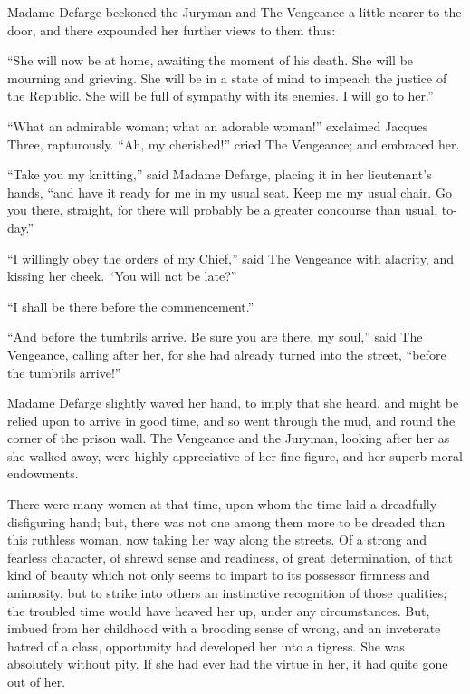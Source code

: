 Madame Defarge beckoned the Juryman and The Vengeance a little nearer
to the door, and there expounded her further views to them thus:

``She will now be at home, awaiting the moment of his death.  She will
be mourning and grieving.  She will be in a state of mind to impeach
the justice of the Republic.  She will be full of sympathy with its
enemies.  I will go to her.''

``What an admirable woman; what an adorable woman!'' exclaimed
Jacques Three, rapturously.  ``Ah, my cherished!'' cried The Vengeance;
and embraced her.

``Take you my knitting,'' said Madame Defarge, placing it in her
lieutenant's hands, ``and have it ready for me in my usual seat.
Keep me my usual chair.  Go you there, straight, for there will
probably be a greater concourse than usual, to-day.''

``I willingly obey the orders of my Chief,'' said The Vengeance with
alacrity, and kissing her cheek.  ``You will not be late?''

``I shall be there before the commencement.''

``And before the tumbrils arrive.  Be sure you are there, my soul,''
said The Vengeance, calling after her, for she had already turned
into the street, ``before the tumbrils arrive!''

Madame Defarge slightly waved her hand, to imply that she heard, and
might be relied upon to arrive in good time, and so went through the
mud, and round the corner of the prison wall.  The Vengeance and the
Juryman, looking after her as she walked away, were highly appreciative
of her fine figure, and her superb moral endowments.

There were many women at that time, upon whom the time laid a
dreadfully disfiguring hand; but, there was not one among them more
to be dreaded than this ruthless woman, now taking her way along the
streets.  Of a strong and fearless character, of shrewd sense and
readiness, of great determination, of that kind of beauty which not
only seems to impart to its possessor firmness and animosity, but to
strike into others an instinctive recognition of those qualities; the
troubled time would have heaved her up, under any circumstances.
But, imbued from her childhood with a brooding sense of wrong, and an
inveterate hatred of a class, opportunity had developed her into a
tigress.  She was absolutely without pity.  If she had ever had the
virtue in her, it had quite gone out of her.

